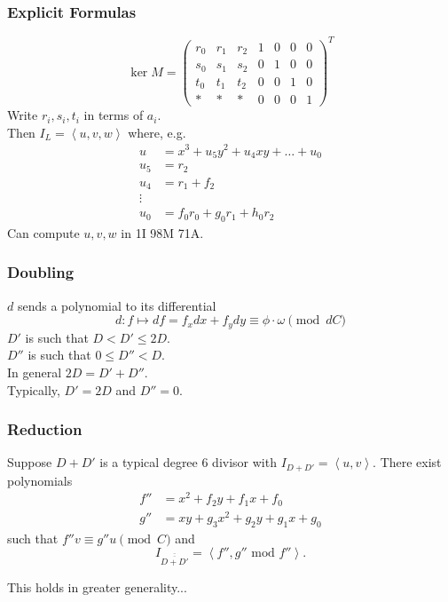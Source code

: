 \documentclass{beamer}
\newcommand{\pid}[1]{\left\langle #1 \right\rangle}
\DeclareMathOperator{\im}{im}
\renewcommand{\bar}{\overline}
\begin{document}

\begin{frame}
\frametitle{Explicit Formulas}
  \[ \ker M = \begin{pmatrix}
    r_0 & r_1 & r_2 & 1 & 0 & 0 & 0 \\
    s_0 & s_1 & s_2 & 0 & 1 & 0 & 0 \\
    t_0 & t_1 & t_2 & 0 & 0 & 1 & 0 \\
      * &   * &   * & 0 & 0 & 0 & 1
  \end{pmatrix}^T \]
  Write $r_i, s_i, t_i$ in terms of $a_i$. \\
  Then $I_L = \pid{u, v, w}$ where, e.g.
  \begin{align*}
    u &= x^3 + u_5y^2 + u_4xy + \dots + u_0 \\
    u_5 &= r_2 \\
    u_4 &= r_1 + f_2 \\
    \vdots \\
    u_0 &= f_0r_0 + g_0r_1 + h_0r_2
  \end{align*}
  Can compute $u, v, w$ in 1I 98M 71A.
\end{frame}


\begin{frame}[fragile]
\frametitle{Doubling}
  \begin{center}
  \end{center}
  $d$ sends a polynomial to its differential
  \[ d : f \mapsto df = f_xdx + f_ydy \equiv \phi \cdot \omega \pmod{dC} \]
  $D'$ is such that $D < D' \leq 2D$. \\
  $D''$ is such that $0 \leq D'' < D$. \\
  In general $2D = D' + D''$. \\
  Typically, $D' = 2D$ and $D'' = 0$.
\end{frame}


\begin{frame}
\frametitle{Reduction}
  \begin{theorem}
    Suppose $D + D'$ is a typical degree 6 divisor with $I_{D + D'} = \pid{u,v}$.
    There exist polynomials
    \begin{align*}
      f'' &= x^2 + f_2y + f_1x + f_0 \\
      g'' &= xy + g_3x^2 + g_2y + g_1x + g_0
    \end{align*}
    such that $f''v \equiv g''u \pmod C$ and
    \[ I_{\bar{\bar{D + D'}}} = \pid{f'', g'' \text{ mod } f''}. \]
  \end{theorem}
  This holds in greater generality...
\end{frame}
\end{document}
